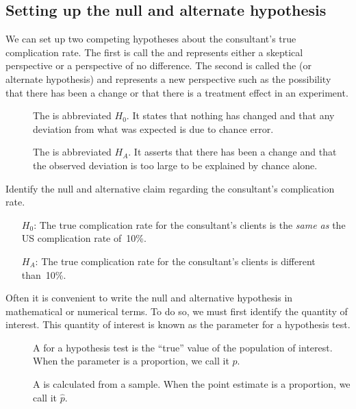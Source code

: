 \subsection{Setting up the null and alternate hypothesis}

We can set up two competing hypotheses about the consultant's true complication rate. The first is call the  and represents either a skeptical perspective or a perspective of no difference. The second is called the  (or alternate hypothesis) and represents a new perspective such as the possibility that there has been a change or that there is a treatment effect in an experiment.

\begin{termBox}{
\vspace{-5mm}
\begin{description}
\item[] The  is abbreviated $H_0$. It states that nothing has changed and that any deviation from what was expected is due to chance error.
\item[] The  is abbreviated $H_A$. It asserts that there has been a change and that the observed deviation is too large to be explained by chance alone.
\end{description}}
\end{termBox}

\begin{example}{Identify the null and alternative claim regarding the consultant's complication rate.}
\begin{itemize}
\item[$H_0$:] The true complication rate for the consultant's clients is the \emph{same as} the US complication rate of~10\%.
\item[$H_A$:] The true complication rate for the consultant's clients is different than~10\%.
\end{itemize}
\end{example}

Often it is convenient to write the null and alternative hypothesis in mathematical or numerical terms. To do so, we must first identify the quantity of interest. This quantity of interest is known as the parameter for a hypothesis test.

\begin{termBox}{
\vspace{-5mm}
\begin{description}
\item[] A  for a hypothesis test is the ``true'' value of the population of interest. When the parameter is a proportion, we call it $p$.
\item[] A  is calculated from a sample. When the point estimate is a proportion, we call it $\hat{p}$.
\end{description}
}
\end{termBox}

